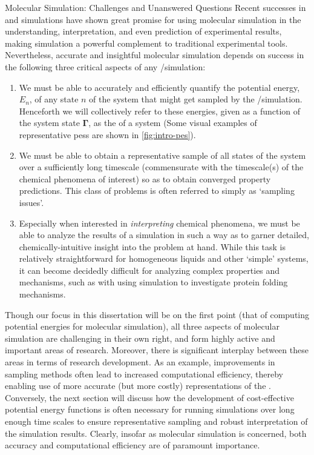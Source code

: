 \begin{section}{Molecular Simulation: Challenges and Unanswered Questions}
Recent successes in \md and \mc simulations
have shown great promise for using molecular simulation in the understanding,
interpretation, and even prediction of experimental
results,\cite{VanGunsteren1990}
making simulation a powerful complement to traditional experimental tools.
\cite{Hospital2015,Karplus2002,Bereau2016,Chen2015,Maurin2016,Jiang2011,Schneider2005,Jorgensen2004}
Nevertheless, accurate and insightful molecular simulation
depends on success in the following three critical aspects of any \md/\mc simulation:
\cite{Lane2013}
%
\begin{enumerate}
\item We must be able to accurately and efficiently quantify the potential
energy, $E_n$, of any state $n$ of the system that might get sampled by the
\md/\mc simulation. 
\cite{Ballone2014,Lopes2015,Saunders2013,DeCarvalho2014}
Henceforth we will collectively refer to these energies, given as a function
of the system state $\bm \Gamma$, as the \pes of a system (Some visual
examples of representative \glspl{pes} are shown in \cref{fig:intro-pes}).
\item We must be able to obtain a representative sample of all states of the system over a sufficiently long timescale
(commensurate with the timescale(s) of the chemical phenomena of interest) so as
to obtain converged property predictions.
\cite{Lei2007,Grossfield2010,Theodorou2010}
This class of problems is often referred to simply as `sampling issues'.
\item Especially when interested in \emph{interpreting} chemical phenomena, we must be
able to analyze the results of a simulation in such a way as to garner
detailed, chemically-intuitive insight into the problem at hand.
\cite{E2010,Pande2010,Rohrdanz2013}
While this task is relatively straightforward for homogeneous liquids and
other `simple' systems,
it can become decidedly
difficult for analyzing complex properties and mechanisms, such as with using
simulation to investigate protein folding mechanisms.
\end{enumerate}
Though our focus in this dissertation will be on the first point (that of
computing potential energies for molecular simulation), all three 
aspects of molecular simulation are challenging in their own right, and form
highly active and important areas of research. 
\cite{Ciccotti2014} 
Moreover, there is significant interplay between these areas in terms of
research development.
As an example, improvements in sampling methods often lead to increased computational
efficiency, thereby enabling use of more accurate (but more costly)
representations of the \pes. Conversely, the next section will discuss how the development of
cost-effective potential energy functions is often necessary for
running simulations over long enough time scales to ensure representative
sampling and robust interpretation of the simulation results. Clearly, insofar
as molecular simulation is concerned, both
accuracy and computational efficiency are of paramount importance. 


\end{section}
